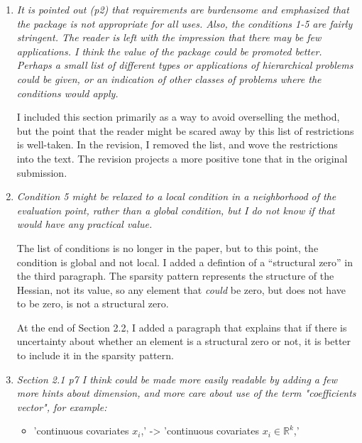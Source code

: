 \documentclass{article}
\newcommand{\Real}[1]{\mathbb{R}^{#1}}
\newenvironment{revQuote}{\itshape}{\vspace{\baselineskip}}
\newenvironment{response}{\normalfont}{\vspace{\baselineskip}}
\begin{document}
\begin{enumerate}[align=left]
\item \begin{revQuote}
It is pointed out (p2) that requirements are burdensome and emphasized
that the package is not appropriate for all uses. Also, the conditions 1-5
are fairly stringent. The reader is left with the impression that there may
be few applications. I think the value of the package could be promoted
better. Perhaps a small list of different types or applications of
hierarchical problems could be given, or an indication of other classes of
problems where the conditions would apply.
    
  \end{revQuote}

  \begin{response}
I included this section primarily as a way to avoid overselling the
method, but the point that the reader might be scared away by this list of
restrictions is well-taken.  In the revision, I removed the list, and
wove the restrictions into the text.  The revision projects a more
positive tone that in the original submission.
\end{response}

\item \begin{revQuote}
Condition 5 might be relaxed to a local condition in a neighborhood of
the evaluation point, rather than a global condition, but I do not know if
that would have any practical value.
  \end{revQuote}

\begin{response}
  The list of conditions is no longer in the paper, but to this point, the
  condition is global and not local.  I added a defintion of a ``structural zero'' in the third
  paragraph. The sparsity pattern represents the structure of the
  Hessian, not its value, so any element that \emph{could} be zero,
  but does not have to be zero, is not a structural zero.

   At the end of Section 2.2, I added a paragraph that explains that
   if there is uncertainty about whether an element is a structural
   zero or not, it is better to include it in the sparsity pattern.
\end{response}

\item \begin{revQuote}
Section 2.1 p7 I think could be made more easily readable by adding a few
more hints about dimension, and more care about use of the term 
"coefficients vector", for example:
\begin{itemize}
  \item 'continuous covariates $x_i$,' -> 'continuous covariates $x_i \in
\Real{k}$,'


\end{itemize}
\end{revQuote}
\end{enumerate}
\end{document}
